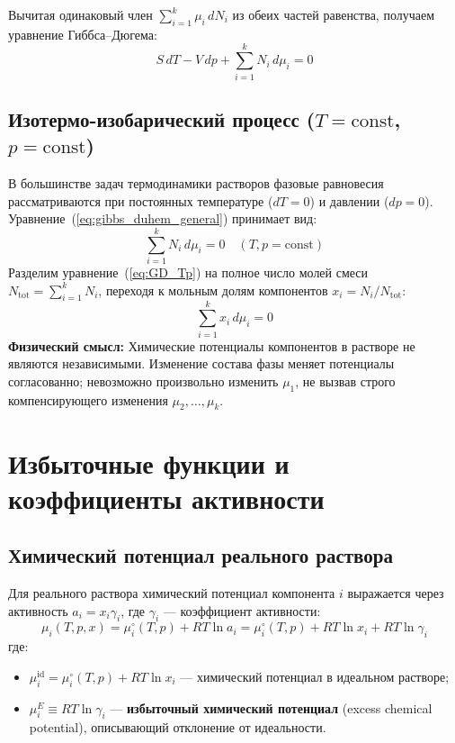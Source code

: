 \documentclass[12pt,a4paper]{article}
\begin{document}
Вычитая одинаковый член $\sum_{i=1}^k \mu_i\,dN_i$ из обеих частей равенства, получаем уравнение Гиббса--Дюгема:
\begin{equation}
    S\,dT - V\,dp + \sum_{i=1}^k N_i\,d\mu_i = 0
    \label{eq:gibbs_duhem_general}
\end{equation}

\subsection{Изотермо-изобарический процесс (\texorpdfstring{$T = \text{const}$}{T = const}, \texorpdfstring{$p = \text{const}$}{p = const})}
В большинстве задач термодинамики растворов фазовые равновесия рассматриваются при постоянных температуре ($dT = 0$) и давлении ($dp = 0$). Уравнение~(\ref{eq:gibbs_duhem_general}) принимает вид:
\begin{equation}
    \sum_{i=1}^k N_i\,d\mu_i = 0 \quad (T, p = \text{const})
    \label{eq:GD_Tp}
\end{equation}
Разделим уравнение~(\ref{eq:GD_Tp}) на полное число молей смеси $N_{\text{tot}} = \sum_{i=1}^k N_i$, переходя к мольным долям компонентов $x_i = N_i / N_{\text{tot}}$:
\begin{equation}
    \sum_{i=1}^k x_i\,d\mu_i = 0
    \label{eq:GD_molar_fractions}
\end{equation}
\textbf{Физический смысл:} Химические потенциалы компонентов в растворе не являются независимыми. Изменение состава фазы меняет потенциалы согласованно; невозможно произвольно изменить $\mu_1$, не вызвав строго компенсирующего изменения $\mu_2, \dots, \mu_k$.

\section{Избыточные функции и коэффициенты активности}

\subsection{Химический потенциал реального раствора}
Для реального раствора химический потенциал компонента $i$ выражается через активность $a_i = x_i \gamma_i$, где $\gamma_i$ — коэффициент активности:
\begin{equation}
    \mu_i(T, p, x) = \mu_i^\circ(T, p) + RT \ln a_i = \mu_i^\circ(T, p) + RT \ln x_i + RT \ln \gamma_i
    \label{eq:mu_real}
\end{equation}
где:
\begin{itemize}
    \item $\mu_i^{\text{id}} = \mu_i^\circ(T, p) + RT \ln x_i$ — химический потенциал в идеальном растворе;
    \item $\mu_i^E \equiv RT \ln \gamma_i$ — \textbf{избыточный химический потенциал} (excess chemical potential), описывающий отклонение от идеальности.
\end{itemize}
\end{document}
